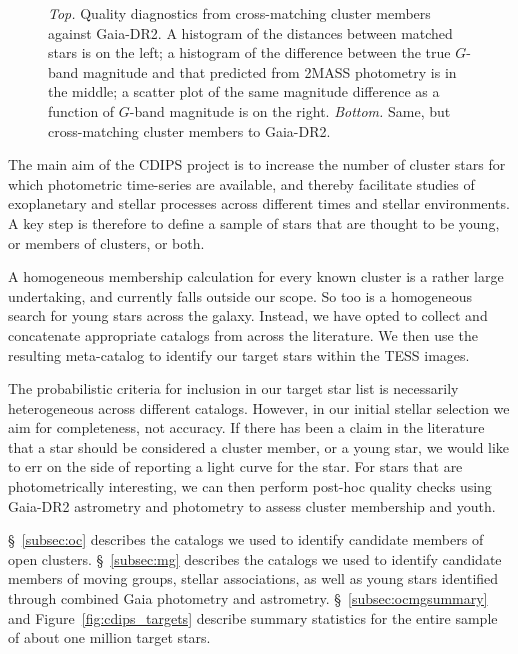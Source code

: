 \documentclass[12pt,twocolumn,tighten]{aastex62}
\begin{document}
\begin{figure}[!t]
	\vspace{-0.8cm}
	\vspace{-0.8cm}
	\caption{
		{\it Top.} Quality diagnostics from cross-matching
		\cite{Kharchenko_et_al_2013} cluster members against Gaia-DR2.
		A histogram of the distances between matched stars is on the left; a
		histogram of the difference between the true $G$-band magnitude
		and that predicted from 2MASS photometry is in the middle; a scatter
		plot of the same magnitude difference as a function of $G$-band
		magnitude is on the right.
		{\it Bottom.} Same, but cross-matching \cite{dias_proper_2014}
		cluster members to Gaia-DR2.
	}
	\label{fig:xmatch_info}
\end{figure}

The main aim of the CDIPS project is to increase the number of cluster
stars for which photometric time-series are available, and thereby
facilitate studies of exoplanetary and stellar processes across
different times and stellar environments.  A key step is
therefore to define a sample of stars that are thought to be young, or
members of clusters, or both.

A homogeneous membership calculation for every known cluster is a
rather large undertaking, and currently falls outside our scope.  So
too is a homogeneous search for young stars across the galaxy.
Instead, we have opted to collect and concatenate appropriate catalogs
from across the literature.  We then use the resulting meta-catalog to
identify our target stars within the TESS images.

The probabilistic criteria for inclusion in our target star list is
necessarily heterogeneous across different catalogs.  However, in our
initial stellar selection we aim for completeness, not accuracy.  If
there has been a claim in the literature that a star should be
considered a cluster member, or a young star, we would like to err on
the side of reporting a light curve for the star.  For stars that are
photometrically interesting, we can then perform post-hoc quality
checks using Gaia-DR2 astrometry and photometry to assess cluster
membership and youth.

\S~\ref{subsec:oc} describes the catalogs we used to identify
candidate members of open clusters.  \S~\ref{subsec:mg} describes the
catalogs we used to identify candidate members of moving groups,
stellar associations, as well as young stars identified through
combined Gaia photometry and astrometry.  \S~\ref{subsec:ocmgsummary}
and Figure~\ref{fig:cdips_targets} describe summary statistics for the
entire sample of about one million target stars.
\end{document}
